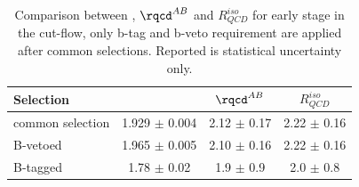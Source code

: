 

\begin{table} [tp]
	\begin{center}
	\begin{tabular}{l  c c c }
\hline 
\hline
Selection  		&  \rqcd  			&  $\rqcd^{AB}$  		&  $R_{QCD}^{iso}$ \\ 
\hline
common selection 		&   1.929 $\pm$     0.004	&	2.12 $\pm$ 0.17		&	2.22 $\pm$ 0.16	\\
B-vetoed			&  1.965   $\pm$   0.005    	& 2.10   $\pm$	0.16 		&	2.22 $\pm$ 0.16	\\
B-tagged			&  1.78    $\pm$   0.02 	& 1.9   $\pm$	0.9 		&	2.0  $\pm$ 0.8	\\
\hline
\hline
	\end{tabular}
	  \caption{Comparison between \rqcd, $\rqcd^{AB}$ and $R_{QCD}^{iso}$ for early stage in the cut-flow, only b-tag and b-veto
	requirement are applied after common selections. Reported is statistical uncertainty only.}
	\label{table:MCsub}
	\end{center}
\end{table}


